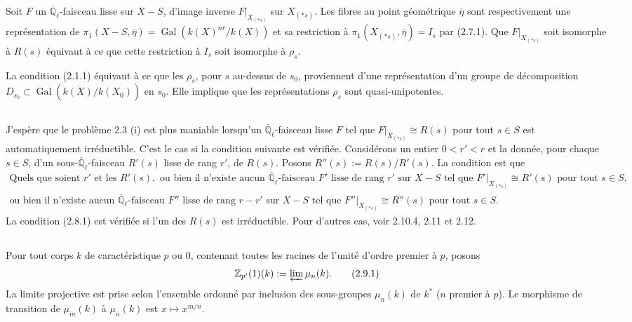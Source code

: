 \documentclass[11pt,a4paper]{article}
\theoremstyle{plain}
\theoremstyle{definition}
\DeclareMathOperator{\Gal}{Gal}
\newcommand{\Z}{\mathbb{Z}}
\newcommand{\Ql}{\overline{\mathbb{Q}}_\ell}
\begin{document}
Soit $F$ un $\Ql$-faisceau lisse sur $X - S$, d'image inverse $F|_{X_{(*s)}}$ sur $X_{(*s)}$. Les fibres au point g\'eom\'etrique $\overline{\eta}$ sont respectivement une repr\'esentation de $\pi_1(X - S, \overline{\eta}) = \Gal(k(X)^{nr}/k(X))$ et sa restriction \`a $\pi_1(X_{(*s)}, \overline{\eta}) = I_s$ par (2.7.1). Que $F|_{X_{(*s)}}$ soit isomorphe \`a $R(s)$ \'equivaut \`a ce que cette restriction \`a $I_s$ soit isomorphe \`a $\rho_s$.

La condition (2.1.1) \'equivaut \`a ce que les $\rho_s$, pour $s$ au-dessus de $s_0$, proviennent d'une repr\'esentation d'un groupe de d\'ecomposition $D_{s_0} \subset \Gal(\overline{k(X)}/k(X_0))$ en $s_0$. Elle implique que les repr\'esentations $\rho_s$ sont quasi-unipotentes.

\subsection{}
J'esp\`ere que le probl\`eme 2.3 (i) est plus maniable lorsqu'un $\Ql$-faisceau lisse $F$ tel que $F|_{X_{(*s)}} \cong R(s)$ pour tout $s \in S$ est automatiquement irr\'eductible. C'est le cas si la condition suivante est v\'erifi\'ee. Consid\'erons un entier $0 < r' < r$ et la donn\'ee, pour chaque $s \in S$, d'un sous-$\Ql$-faisceau $R'(s)$ lisse de rang $r'$, de $R(s)$. Posons $R''(s) := R(s)/R'(s)$. La condition est que
\begin{multline}
\text{Quels que soient } r' \text{ et les } R'(s), \text{ ou bien il n'existe aucun } \Ql\text{-faisceau } F' \text{ lisse de rang } r' \text{ sur } X - S \text{ tel que } F'|_{X_{(*s)}} \cong R'(s) \text{ pour tout } s \in S, \\ \text{ou bien il n'existe aucun } \Ql\text{-faisceau } F'' \text{ lisse de rang } r - r' \text{ sur } X - S \text{ tel que } F''|_{X_{(*s)}} \cong R''(s) \text{ pour tout } s \in S.
\tag{2.8.1}
\end{multline}
La condition (2.8.1) est v\'erifi\'ee si l'un des $R(s)$ est irr\'eductible. Pour d'autres cas, voir 2.10.4, 2.11 et 2.12.

\subsection{}
Pour tout corps $k$ de caract\'eristique $p$ ou $0$, contenant toutes les racines de l'unit\'e d'ordre premier \`a $p$, posons
\begin{equation}
\Z_{p'}(1)(k) := \varprojlim \mu_n(k).
\tag{2.9.1}
\end{equation}
La limite projective est prise selon l'ensemble ordonn\'e par inclusion des sous-groupes $\mu_n(k)$ de $k^*$ ($n$ premier \`a $p$). Le morphisme de transition de $\mu_m(k)$ \`a $\mu_n(k)$ est $x \mapsto x^{m/n}$.
\end{document}
